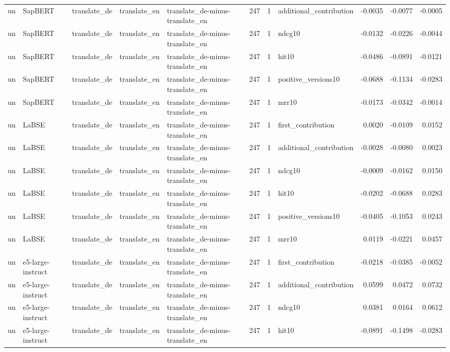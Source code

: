 \begin{tabular}{lllllrrlrrr}
un & SapBERT & translate\_de & translate\_en & translate\_de-minus-translate\_en & 247 & 1 & additional\_contribution & -0.0035 & -0.0077 & -0.0005 \\
un & SapBERT & translate\_de & translate\_en & translate\_de-minus-translate\_en & 247 & 1 & ndcg10 & -0.0132 & -0.0226 & -0.0044 \\
un & SapBERT & translate\_de & translate\_en & translate\_de-minus-translate\_en & 247 & 1 & hit10 & -0.0486 & -0.0891 & -0.0121 \\
un & SapBERT & translate\_de & translate\_en & translate\_de-minus-translate\_en & 247 & 1 & positive\_versions10 & -0.0688 & -0.1134 & -0.0283 \\
un & SapBERT & translate\_de & translate\_en & translate\_de-minus-translate\_en & 247 & 1 & mrr10 & -0.0173 & -0.0342 & -0.0014 \\
un & LaBSE & translate\_de & translate\_en & translate\_de-minus-translate\_en & 247 & 1 & first\_contribution & 0.0020 & -0.0109 & 0.0152 \\
un & LaBSE & translate\_de & translate\_en & translate\_de-minus-translate\_en & 247 & 1 & additional\_contribution & -0.0028 & -0.0080 & 0.0023 \\
un & LaBSE & translate\_de & translate\_en & translate\_de-minus-translate\_en & 247 & 1 & ndcg10 & -0.0009 & -0.0162 & 0.0150 \\
un & LaBSE & translate\_de & translate\_en & translate\_de-minus-translate\_en & 247 & 1 & hit10 & -0.0202 & -0.0688 & 0.0283 \\
un & LaBSE & translate\_de & translate\_en & translate\_de-minus-translate\_en & 247 & 1 & positive\_versions10 & -0.0405 & -0.1053 & 0.0243 \\
un & LaBSE & translate\_de & translate\_en & translate\_de-minus-translate\_en & 247 & 1 & mrr10 & 0.0119 & -0.0221 & 0.0457 \\
un & e5-large-instruct & translate\_de & translate\_en & translate\_de-minus-translate\_en & 247 & 1 & first\_contribution & -0.0218 & -0.0385 & -0.0052 \\
un & e5-large-instruct & translate\_de & translate\_en & translate\_de-minus-translate\_en & 247 & 1 & additional\_contribution & 0.0599 & 0.0472 & 0.0732 \\
un & e5-large-instruct & translate\_de & translate\_en & translate\_de-minus-translate\_en & 247 & 1 & ndcg10 & 0.0381 & 0.0164 & 0.0612 \\
un & e5-large-instruct & translate\_de & translate\_en & translate\_de-minus-translate\_en & 247 & 1 & hit10 & -0.0891 & -0.1498 & -0.0283 \\

\end{tabular}
